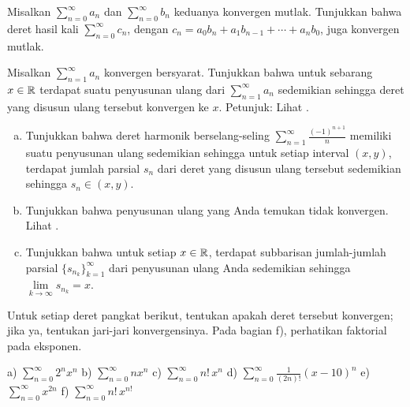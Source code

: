\begin{exercise}
Misalkan $\sum_{n=0}^\infty a_n$ dan $\sum_{n=0}^\infty b_n$ keduanya
konvergen mutlak.
Tunjukkan bahwa deret hasil kali $\sum_{n=0}^\infty c_n$, dengan
$c_n = a_0 b_n + a_1 b_{n-1} + \cdots + a_n b_0$, juga konvergen mutlak.
\end{exercise}

\begin{exercise}[Menantang] \label{exercise:seriesconvergestoanything}
Misalkan $\sum_{n=1}^\infty a_n$ konvergen bersyarat.
Tunjukkan bahwa untuk sebarang $x \in {\mathbb{R}}$
terdapat suatu penyusunan ulang dari $\sum_{n=1}^\infty a_n$
sedemikian sehingga deret yang disusun ulang tersebut konvergen ke $x$.
Petunjuk: Lihat .
\end{exercise}

\begin{exercise}
\pagebreak[2]
\leavevmode
\begin{enumerate}[a)]
\item
Tunjukkan bahwa deret harmonik berselang-seling $\sum_{n=1}^\infty \frac{{(-1)}^{n+1}}{n}$
memiliki suatu penyusunan ulang
sedemikian sehingga untuk setiap interval $(x,y)$, terdapat jumlah parsial $s_n$
dari deret yang disusun ulang tersebut sedemikian sehingga $s_n \in (x,y)$.
\item
Tunjukkan bahwa penyusunan ulang yang Anda temukan tidak konvergen.
Lihat .
\item
Tunjukkan bahwa untuk setiap $x \in {\mathbb{R}}$, terdapat subbarisan
jumlah-jumlah parsial $\{ s_{n_k} \}_{k=1}^\infty$ dari penyusunan ulang Anda sedemikian sehingga
$\lim\limits_{k\to\infty} s_{n_k} = x$.
\end{enumerate}
\end{exercise}

\begin{exercise}
Untuk setiap deret pangkat berikut, tentukan apakah deret tersebut konvergen;
jika ya, tentukan jari-jari konvergensinya.
Pada bagian f), perhatikan faktorial pada eksponen.

\medskip

\noindent
a)
$\displaystyle \sum_{n=0}^\infty 2^n x^n$
\qquad
b) $\displaystyle \sum_{n=0}^\infty n x^n$
\qquad 
c) 
$\displaystyle \sum_{n=0}^\infty n! \, x^n$
\qquad
d) $\displaystyle \sum_{n=0}^\infty \frac{1}{(2n)!} {(x-10)}^n$
\qquad
e) $\displaystyle \sum_{n=0}^\infty x^{2n}$
\qquad
f) $\displaystyle \sum_{n=0}^\infty n! \, x^{n!}$
\end{exercise}

